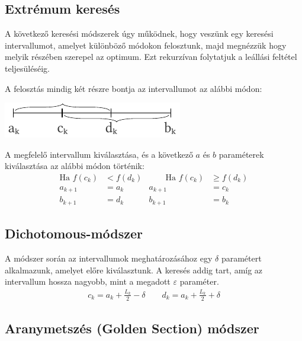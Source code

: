 \documentclass[a4paper,12pt,svgnames]{report}
\begin{document}
\begin{multicols}{2}





\section{Extrémum keresés}

\firstline A következő keresési módszerek úgy működnek, hogy veszünk egy keresési intervallumot, amelyet különböző módokon felosztunk, majd megnézzük hogy melyik részében szerepel az optimum. Ezt rekurzívan folytatjuk a leállási feltétel teljesüléséig.

A felosztás mindig két részre bontja az intervallumot az alábbi módon:
\begin{center}
\includegraphics{kepek/extremum.pdf}
\end{center}

A megfelelő intervallum kiválasztása, és a következő $a$ és $b$ paraméterek kiválasztása az alábbi módon történik:
\begin{alignat*}{3}
\mbox{Ha } f(c_k)&<f(d_k) &\qquad \mbox{Ha } f(c_k)&\geq f(d_k)\\
a_{k+1}&=a_k & a_{k+1}&=c_k\\
b_{k+1}&=d_k & b_{k+1}&=b_k 
\end{alignat*}

\subsection{Dichotomous-módszer}

\firstline A módszer során az intervallumok meghatározásához egy $\delta$ paramétert alkalmazunk, amelyet előre kiválasztunk. A keresés addig tart, amíg az intervallum hossza nagyobb, mint a megadott $\varepsilon$ paraméter.
\begin{gather*}
c_k=a_k+\frac{L_k}{2}-\delta \qquad
d_k=a_k+\frac{L_k}{2}+\delta 
\end{gather*}

\subsection{Aranymetszés (Golden Section) módszer}


\end{multicols}
\end{document}
